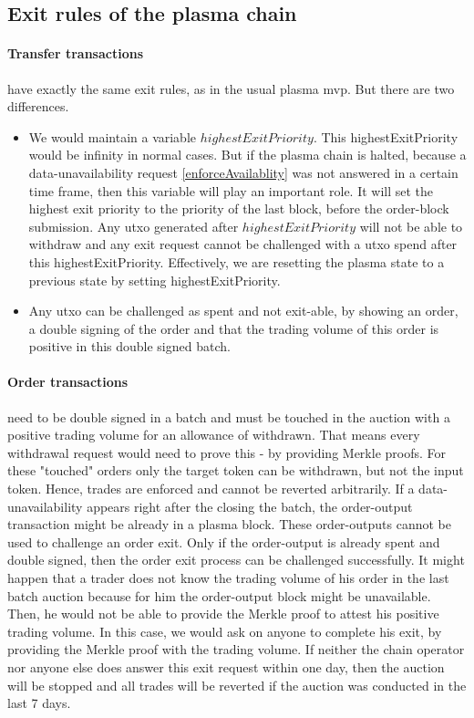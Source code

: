 \documentclass[11pt,parskip=full]{scrartcl}%
\begin{document}
\subsection{Exit rules of the plasma chain}
\label{exitRules}
\paragraph{Transfer transactions} have exactly the same exit rules, as in the usual plasma mvp. But there are two differences. 
\begin{itemize}
  \item We would maintain a variable $highestExitPriority$. This highestExitPriority would be infinity in normal cases. But if the plasma chain is halted, because a data-unavailability request \ref{enforceAvailablity} was not answered in a certain time frame, then this variable will play an important role. It will set the highest exit priority to the priority of the last block, before the order-block submission. Any utxo generated after $highestExitPriority$ will not be able to withdraw and any exit request cannot be challenged with a utxo spend after this highestExitPriority. Effectively, we are resetting the plasma state to a previous state by setting highestExitPriority.
\item Any utxo can be challenged as spent and not exit-able, by showing an order, a double signing of the order and that the trading volume of this order is positive in this double signed batch.
\end{itemize}
\paragraph{Order transactions} need to be double signed in a batch and must be touched in the auction with a positive trading volume for an allowance of withdrawn. That means every withdrawal request would need to prove this - by providing Merkle proofs. For these  "touched" orders only the target token can be withdrawn, but not the input token. Hence, trades are enforced and cannot be reverted arbitrarily.
If a data-unavailability appears right after the closing the batch, the order-output transaction might be already in a plasma block. These order-outputs cannot be used to challenge an order exit. Only if the order-output is already spent and double signed, then the order exit process can be challenged successfully.
It might happen that a trader does not know the trading volume of his order in the last batch auction because for him the order-output block might be unavailable. Then, he would not be able to provide the Merkle proof to attest his positive trading volume. In this case, we would ask on anyone to complete his exit, by providing the Merkle proof with the trading volume. If neither the chain operator nor anyone else does answer this exit request within one day, then the auction will be stopped and all trades will be reverted if the auction was conducted in the last 7 days.
\end{document}

